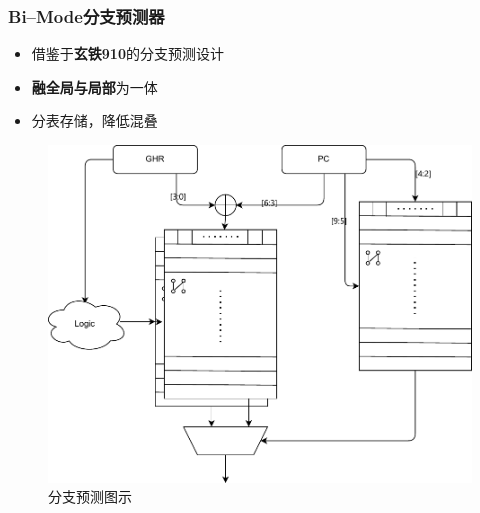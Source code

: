 \documentclass{beamer}
\begin{document}
\begin{frame}
    \frametitle{Bi--Mode分支预测器}

    \begin{minipage}[c]{0.45\linewidth}
        \begin{itemize}
            \item 借鉴于\textbf{玄铁910}的分支预测设计
            \item \textbf{融全局与局部}为一体
            \item 分表存储，降低混叠
        \end{itemize}
    \end{minipage}\hfill
    \begin{minipage}{0.5\linewidth}
        \medskip
        \begin{figure}
            \centering
            \includegraphics[width=\linewidth]{pic/branch-predict.pdf}
            \caption{分支预测图示}
        \end{figure}
    \end{minipage}

\end{frame}
\end{document}
